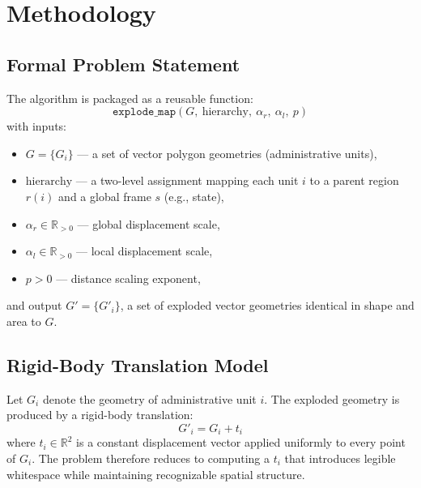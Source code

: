 \documentclass[12pt, a4paper]{article}
\numberwithin{equation}{section}
\begin{document}
\section{Methodology}

\subsection{Formal Problem Statement}

The algorithm is packaged as a reusable function:
\[
  \texttt{explode\_map}(G,\ \text{hierarchy},\ \alpha_r,\ \alpha_l,\ p)
\]
with inputs:
\begin{itemize}
  \item $G = \{G_i\}$ --- a set of vector polygon geometries (administrative units),
  \item $\text{hierarchy}$ --- a two-level assignment mapping each unit $i$ to a parent region $r(i)$ and a global frame $s$ (e.g., state),
  \item $\alpha_r \in \mathbb{R}_{>0}$ --- global displacement scale,
  \item $\alpha_l \in \mathbb{R}_{>0}$ --- local displacement scale,
  \item $p > 0$ --- distance scaling exponent,
\end{itemize}
and output $G' = \{G'_i\}$, a set of exploded vector geometries identical in shape and area to $G$.

\subsection{Rigid-Body Translation Model}

Let $G_i$ denote the geometry of administrative unit $i$. The exploded geometry is produced by a rigid-body translation:
\begin{equation}
  G'_i = G_i + t_i
  \label{eq:translation}
\end{equation}
where $t_i \in \mathbb{R}^2$ is a constant displacement vector applied uniformly to every point of $G_i$. The problem therefore reduces to computing a $t_i$ that introduces legible whitespace while maintaining recognizable spatial structure.
\end{document}
